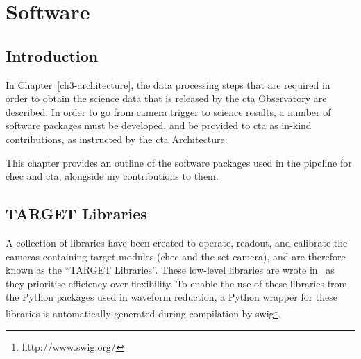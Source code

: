 \chapter{\label{ch4-software}Software} 

\minitoc


\section{Introduction}

In Chapter~\ref{ch3-architecture}, the data processing steps that are required in order to obtain the science data that is released by the \gls{cta} Observatory are described. In order to go from camera trigger to science results, a number of software packages must be developed, and be provided to \gls{cta} as in-kind contributions, as instructed by the \gls{cta} Architecture. 

This chapter provides an outline of the software packages used in the pipeline for \gls{chec} and \gls{cta}, alongside my contributions to them.

\section{TARGET Libraries}

A collection of libraries have been created to operate, readout, and calibrate the cameras containing \gls{target} modules (\gls{chec} and the \gls{sct} camera), and are therefore known as the ``TARGET Libraries''. These low-level libraries are wrote in \cpp~as they prioritise efficiency over flexibility. To enable the use of these libraries from the Python packages used in waveform reduction, a Python wrapper for these libraries is automatically generated during compilation by \gls{swig}\footnote{http://www.swig.org/}.

